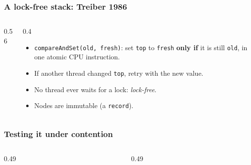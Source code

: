 \documentclass[aspectratio=169,10pt,compress]{beamer}
\begin{document}
\begin{frame}[t,fragile] \frametitle{A lock-free stack: Treiber 1986}
  \begin{columns}[T]
    \begin{column}{0.56\textwidth}
    \end{column}
    \begin{column}{0.4\textwidth}
      \begin{itemize}\small
        \item \texttt{compareAndSet(old, fresh)}: set \texttt{top} to \texttt{fresh} \textbf{only if} it is still \texttt{old}, in one atomic CPU instruction.
        \item If another thread changed \texttt{top}, retry with the new value.
        \item No thread ever waits for a lock: \emph{lock-free}.
        \item Nodes are immutable (a \texttt{record}).
      \end{itemize}
    \end{column}
  \end{columns}
\end{frame}




\begin{frame}[t,fragile] \frametitle{Testing it under contention}
  \begin{columns}[T]
    \begin{column}{0.49\textwidth}
    \end{column}
    \begin{column}{0.49\textwidth}
    \end{column}
  \end{columns}
\end{frame}
\end{document}
